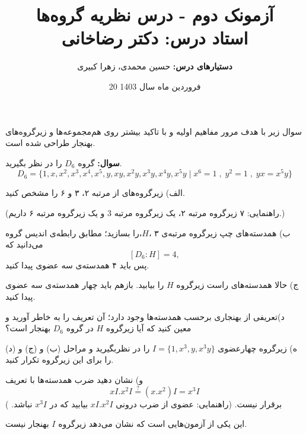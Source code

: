 \documentclass[12pt]{article}
\begin{document}
	
	\title{آزمونک دوم - درس نظریه‌ گروه‌ها
		\\
	{\normalsize 
	\textbf{استاد درس:}
	دکتر رضاخانی
	}
	}
	\author{
	\small
	\textbf{دستیارهای درس:}
	 حسین محمدی، زهرا کبیری
	} 
\date{20 فروردین ماه سال 1403}
	\maketitle
	سوال زیر با هدف مرور مفاهیم اولیه و با تاکید بیشتر روی هم‌مجموعه‌ها و زیرگروه‌های بهنجار طراحی شده است.
	
	\vspace{1.5em}
	\noindent
	\textbf{ سوال:}
 گروه 
 $D_6$  را در نظر بگیرید.
 \[
 D_6 = \{1,x,x^2,x^3,x^4,x^5,y,xy,x^2y,x^3y,x^4y,x^5y \;\big|\; x^6=1 \; , \; y^2=1 \;,\; yx = x^5y\}
 \]
 
 \noindent
	الف) زیرگروه‌های از مرتبه ۲، ۳ و ۶ را مشخص کنید.
	 
	(راهنمایی: ۷ زیرگروه مرتبه ۲، یک زیرگروه مرتبه 3 و یک زیرگروه مرتبه ۶ داریم.)
	
	\noindent
	ب) همدسته‌های چپ زیرگروه مرتبه‌ی ۳ ،$H$،را بسازید؛ مطابق  رابطه‌ی اندیس گروه می‌دانید که 
	\[[D_6:H] = 4, \]
 پس باید ۴ همدسته‌ی سه عضوی پیدا کنید.
	
\noindent
ج) حالا همدسته‌های راست زیرگروه $H$ را بیابید. بازهم باید چهار همدسته‌ی سه عضوی پیدا کنید.

\noindent
د)تعریفی از بهنجاری برحسب همدسته‌ها وجود دارد؛ آن تعریف را به خاطر آورید و معین کنید که آیا زیرگروه $H$ در گروه $D_6$ بهنجار است؟

\noindent
ه) زیرگروه چهارعضوی 
$I = \{1,x^3,y,x^3y\}$
را در نظربگیرید و مراحل (ب) و (ج) و (د) را برای این زیرگروه تکرار کنید.

\noindent
و) نشان دهید ضرب همدسته‌ها با تعریف 
\[
xI . x^2I \overset{?}{=}(x.x^2) I = x^3 I
\]
	برقرار نیست. (راهنمایی: عضوی از ضرب درونی 
	$xI . x^2I$
	بیابید که در 
	$x^3I$
	نباشد.
	)
	
	\noindent
	این یکی از آزمون‌هایی است که نشان می‌دهد زیرگروه $I$ بهنجار نیست.
	

	
	

	
	
	
	
	
	
	
	
	
	
\end{document}
